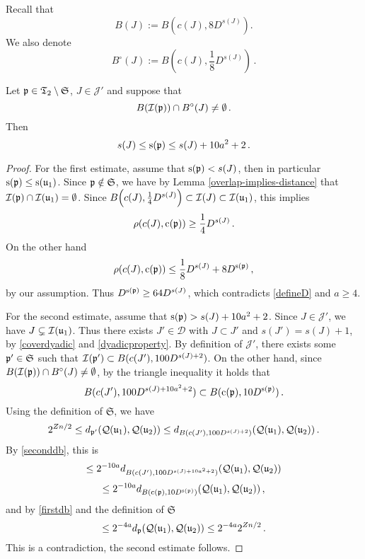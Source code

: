 {    Recall that
    \begin{equation*}
        B(J) := B(c(J), 8D^{s(J)}).
    \end{equation*}
    We also denote
    \begin{equation*}
     B^\circ{}(J) := B(c(J), \frac{1}{8}D^{s(J)})\, .    \end{equation*}


    \begin{lemma}
        \label{limited-scale-impact}
        Let ${\mathfrak p} \in {\mathfrak T}_2 \setminus \mathfrak{S}$, $J \in \mathcal{J}'$ and suppose that
        $$
           B({\mathcal{I}}({\mathfrak p})) \cap B^\circ(J)  \ne \emptyset\,.
        $$
        Then
        $$
            s(J) \le {\mathrm{s}}({\mathfrak p}) \le s(J) + 10a^2 + 2\,.
        $$
    \end{lemma}

    \begin{proof}
        For the first estimate, assume that ${\mathrm{s}}({\mathfrak p}) < s(J)$, then in particular ${\mathrm{s}}({\mathfrak p}) \le {\mathrm{s}}({\mathfrak u}_1)$. Since ${\mathfrak p} \notin \mathfrak{S}$, we have by Lemma \ref{overlap-implies-distance} that ${\mathcal{I}}({\mathfrak p}) \cap {\mathcal{I}}({\mathfrak u}_1) = \emptyset$.
        Since $B\Big(c(J), \frac{1}{4} D^{s(J)}\Big) \subset {\mathcal{I}}(J) \subset {\mathcal{I}}({\mathfrak u}_1)$, this implies
        $$
            \rho(c(J), {\mathrm{c}}({\mathfrak p})) \ge \frac{1}{4}D^{s(J)}\,.
        $$
        On the other hand
        $$
            \rho(c(J), {\mathrm{c}}({\mathfrak p})) \le \frac{1}{8} D^{s(J)} + 8 D^{{\mathrm{s}}({\mathfrak p})}\,,
        $$
        by our assumption. Thus $D^{{\mathrm{s}}({\mathfrak p})} \ge 64 D^{s(J)}$, which contradicts \eqref{defineD} and $a \ge 4$.

        For the second estimate, assume that ${\mathrm{s}}({\mathfrak p}) > s(J) +10a^2 + 2$. Since $J \in \mathcal{J}'$, we have $J \subsetneq {\mathcal{I}}({\mathfrak u}_1)$. Thus there exists $J' \in \mathcal{D}$ with $J \subset J'$ and $s(J') = s(J) + 1$, by \eqref{coverdyadic} and \eqref{dyadicproperty}. By definition of $\mathcal{J}'$, there exists some ${\mathfrak p}' \in \mathfrak{S}$ such that ${\mathcal{I}}({\mathfrak p}') \subset B(c(J'), 100 D^{s(J) + 2})$. On the other hand, since $B({\mathcal{I}}({\mathfrak p})) \cap B^\circ(J)  \ne \emptyset$, by the triangle inequality it holds that
        $$
            B(c(J'), 100 D^{s(J) + 10a^2 + 2}) \subset B({\mathrm{c}}({\mathfrak p}), 10 D^{{\mathrm{s}}({\mathfrak p})})\,.
        $$
        Using the definition of $\mathfrak{S}$, we have
        $$
            2^{Zn/2} \le d_{{\mathfrak p}'}({\mathcal{Q}}({\mathfrak u}_1), {\mathcal{Q}}({\mathfrak u}_2)) \le d_{B(c(J'), 100 D^{s(J) + 2})}({\mathcal{Q}}({\mathfrak u}_1), {\mathcal{Q}}({\mathfrak u}_2))\,.
        $$
        By \eqref{seconddb}, this is
        $$
            \le 2^{-10a} d_{B(c(J'), 100 D^{s(J) + 10a^2 + 2})}({\mathcal{Q}}({\mathfrak u}_1), {\mathcal{Q}}({\mathfrak u}_2))
        $$
        $$
            \le 2^{-10a} d_{B({\mathrm{c}}({\mathfrak p}), 10 D^{{\mathrm{s}}({\mathfrak p})})}({\mathcal{Q}}({\mathfrak u}_1), {\mathcal{Q}}({\mathfrak u}_2))\,,
        $$
        and by \eqref{firstdb} and the definition of $\mathfrak{S}$
        $$
            \le 2^{-4a} d_{{\mathfrak p}}({\mathcal{Q}}({\mathfrak u}_1), {\mathcal{Q}}({\mathfrak u}_2)) \le 2^{-4a} 2^{Zn/2}\,.
        $$
        This is a contradiction, the second estimate follows.
    \end{proof}


}
